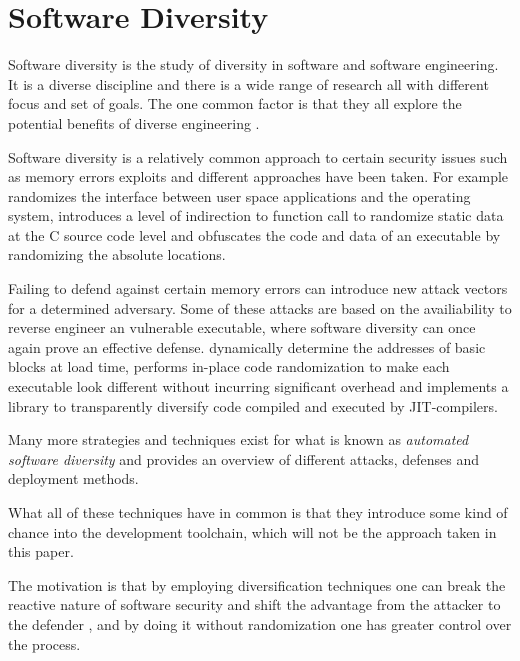 \section{Software Diversity}

Software diversity is the study of diversity in software and software engineering. It is
a diverse discipline and there is a wide range of research all with different focus and
set of goals. The one common factor is that they all explore the potential benefits of
diverse engineering \cite{survey}.

Software diversity is a relatively common approach to certain security issues such as
memory errors exploits and different approaches have been taken. For example
\textcite{os-randomization} randomizes the interface between user space applications and
the operating system, \textcite{mem-exploits} introduces a level of indirection to function
call to randomize static data at the C source code level and \textcite{add-obfuscation}
obfuscates the code and data of an executable by randomizing the absolute locations.

Failing to defend against certain memory errors can introduce new attack vectors for a
determined adversary. Some of these attacks are based on the availiability to reverse engineer
an vulnerable executable, where software diversity can once again prove an effective defense.
\textcite{binary-stirring} dynamically determine the addresses of basic blocks at load time,
\textcite{smashing-gadgets} performs in-place code randomization to make each executable
look different without incurring significant overhead and \textcite{librando} implements
a library to transparently diversify code compiled and executed by JIT-compilers.

Many more strategies and techniques exist for what is known as
\textit{automated software diversity} and \textcite{SoK} provides an overview of different
attacks, defenses and deployment methods.


What all of these techniques have in common is that they introduce some kind of chance into
the development toolchain, which will not be the approach taken in this paper.

The motivation is that by employing diversification techniques one can break the
reactive nature of software security and shift the advantage from the attacker to the
defender \cite{compiler-generated-sw-div}, and by doing it without randomization one has
greater control over the process.

